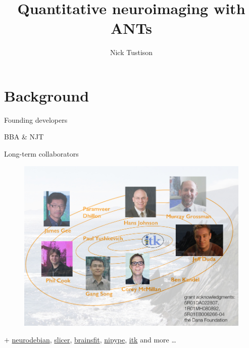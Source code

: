 \documentclass[ignorenonframetext,]{beamer}
\institute{University of Virginia}
\title{Quantitative neuroimaging with ANTs}
\author{Nick Tustison}
\date{}
\begin{document}
\frame{\titlepage}

\section{Background}\label{background}

\begin{frame}{Founding developers}

BBA \& NJT

\end{frame}

\begin{frame}{Long-term collaborators}

\begin{figure}[htbp]
\centering
\includegraphics{./figures/antscollab.jpg}
\caption{}
\end{figure}

\(+\) \href{http://neuro.debian.net/pkgs/ants.html}{neurodebian},
\href{http://www.slicer.org/}{slicer},
\href{https://github.com/BRAINSia/BRAINSTools}{brainsfit},
\href{http://nipy.sourceforge.net/nipype/}{nipype},
\href{http://www.itk.org}{itk} and more \ldots{}

\end{frame}
\end{document}
